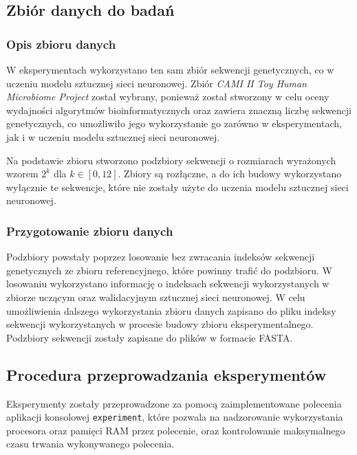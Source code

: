     \subsection{Zbiór danych do badań}

        \subsubsection{Opis zbioru danych}

            W eksperymentach wykorzystano ten sam zbiór sekwencji genetycznych, co w uczeniu modelu sztucznej sieci neuronowej. Zbiór \textit{CAMI II Toy Human Microbiome Project}\cite{Fritz:2019} został wybrany, ponieważ został stworzony w celu oceny wydajności algorytmów bioinformatycznych oraz zawiera znaczną liczbę sekwencji genetycznych, co umożliwiło jego wykorzystanie go zarówno w eksperymentach, jak i w uczeniu modelu sztucznej sieci neuronowej.

            Na podstawie zbioru stworzono podzbiory sekwencji o rozmiarach wyrażonych wzorem $2^k$ dla $k \in [0, 12]$. Zbiory są rozłączne, a do ich budowy wykorzystano wyłącznie te sekwencje, które nie zostały użyte do uczenia modelu sztucznej sieci neuronowej.

        \subsubsection{Przygotowanie zbioru danych}

            Podzbiory powstały poprzez losowanie bez zwracania indeksów sekwencji genetycznych ze zbioru referencyjnego, które powinny trafić do podzbioru. W losowaniu wykorzystano informację o indeksach sekwencji wykorzystanych w zbiorze uczącym oraz walidacyjnym sztucznej sieci neuronowej. W celu umożliwienia dalszego wykorzystania zbioru danych zapisano do pliku indeksy sekwencji wykorzystanych w procesie budowy zbioru eksperymentalnego. Podzbiory sekwencji zostały zapisane do plików w formacie FASTA.

    \subsection{Procedura przeprowadzania eksperymentów}

        Eksperymenty zostały przeprowadzone za pomocą zaimplementowane polecenia aplikacji konsolowej \texttt{experiment}, które pozwala na nadzorowanie wykorzystania procesora oraz pamięci RAM przez polecenie, oraz kontrolowanie maksymalnego czasu trwania wykonywanego polecenia.

